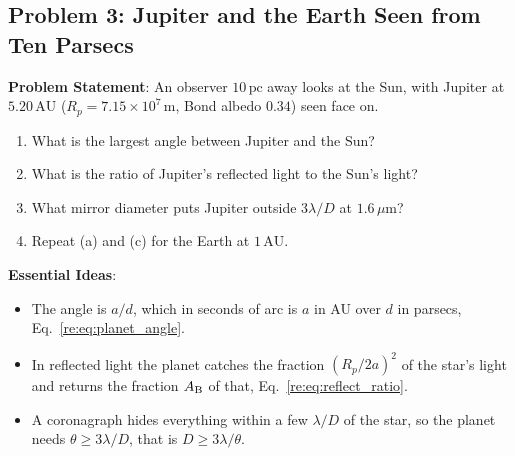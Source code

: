 \subsection{Problem 3: Jupiter and the Earth Seen from Ten Parsecs}
\label{re:prob:direct_imaging}

\textbf{Problem Statement}: An observer $10\,\mathrm{pc}$ away looks at the Sun, with Jupiter at $5.20\,\mathrm{AU}$ ($R_p=7.15\times10^7\,\mathrm m$, Bond albedo $0.34$) seen face on.
\begin{enumerate}[label=(\alph*)]
	\item What is the largest angle between Jupiter and the Sun?
	\item What is the ratio of Jupiter's reflected light to the Sun's light?
	\item What mirror diameter puts Jupiter outside $3\lambda/D$ at $1.6\,\mu\mathrm m$?
	\item Repeat (a) and (c) for the Earth at $1\,\mathrm{AU}$.
\end{enumerate}

\textbf{Essential Ideas}:
\begin{itemize}
	\item The angle is $a/d$, which in seconds of arc is $a$ in AU over $d$ in parsecs, Eq.~\eqref{re:eq:planet_angle}.
	\item In reflected light the planet catches the fraction $(R_p/2a)^2$ of the star's light and returns the fraction $A_{\rm B}$ of that, Eq.~\eqref{re:eq:reflect_ratio}.
	\item A coronagraph hides everything within a few $\lambda/D$ of the star, so the planet needs $\theta\ge3\lambda/D$, that is $D\ge3\lambda/\theta$.
\end{itemize}

